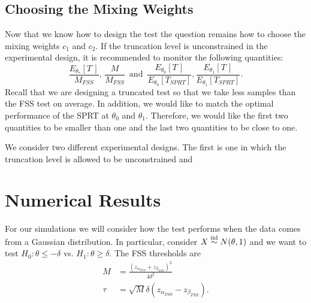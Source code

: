 \documentclass[11pt]{article}
\begin{document}
\subsection{Choosing the Mixing Weights}

Now that we know how to design the test the question remains how to choose the mixing weights $c_1$ and $c_2$. If the truncation level is unconstrained in the experimental design, it is recommended to monitor the following quantities:
\begin{equation}\label{eq:c_optim}
\frac{E_{\theta_{*}}[T\,]}{M_{FSS}}, \, \frac{M}{M_{FSS}}  \, \text{ and } \, \frac{E_{\theta_0}[T\,]}{E_{\theta_0}[T_{SPRT}]}, \frac{E_{\theta_1}[T\,]}{E_{\theta_1}[T_{SPRT}]}.
\end{equation}
Recall that we are designing a truncated test so that we take less samples than the FSS test on average. In addition, we would like to match the optimal performance of the SPRT at $\theta_0$ and $\theta_1$. Therefore, we would like the first two quantities to be smaller than one and the last two quantities to be close to one.

We consider two different experimental designs. The first is one in which the truncation level is allowed to be unconstrained and


\section{Numerical Results}

For our simulations we will consider how the test performs when the data comes from a Gaussian distribution. In particular, consider $X \overset{\text{iid}}\sim N(\theta, 1)$ and we want to test $H_0 : \theta \leq -\delta$ vs. $H_1 : \theta \geq \delta$. The FSS thresholds are
\begin{equation}
\begin{split}
M &= \frac{(z_{\alpha_{FSS}} + z_{\beta_{FSS}})^2}{4 \delta^2} \\
\tau &= \sqrt{M} \delta (z_{\alpha_{FSS}} - z_{\beta_{FSS}}).
\end{split}
\end{equation}
\end{document}
